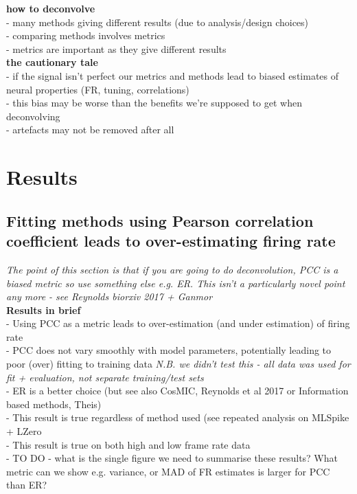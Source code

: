 \documentclass[a4paper]{article}
\begin{document}
\noindent \textbf{how to deconvolve}\\
- many methods giving different results (due to analysis/design choices)\\
- comparing methods involves metrics\\
- metrics are important as they give different results\\

\noindent \textbf{the cautionary tale}\\
- if the signal isn't perfect our metrics and methods lead to biased estimates of neural properties (FR, tuning, correlations)\\
- this bias may be worse than the benefits we're supposed to get when deconvolving \\
- artefacts may not be removed after all\\

\newpage

\section{Results} 
\subsection*{Fitting methods using Pearson correlation coefficient leads to over-estimating firing rate}
\emph{The point of this section is that if you are going to do deconvolution, PCC is a biased metric so use something else e.g. ER. This isn't a particularly novel point any more - see Reynolds biorxiv 2017 + Ganmor}\\

\noindent \textbf{Results in brief}\\
- Using PCC as a metric leads to over-estimation (and under estimation) of firing rate\\
- PCC does not vary smoothly with model parameters, potentially leading to poor (over) fitting to training data \emph{N.B. we didn't test this - all data was used for fit + evaluation, not separate training/test sets}\\
- ER is a better choice (but see also CosMIC, Reynolds et al 2017 or Information based methods, Theis)\\
- This result is true regardless of method used (see repeated analysis on MLSpike + LZero\\
- This result is true on both high and low frame rate data\\
- TO DO - what is the single figure we need to summarise these results? What metric can we show e.g. variance, or MAD of FR estimates is larger for PCC than ER?
\end{document}
